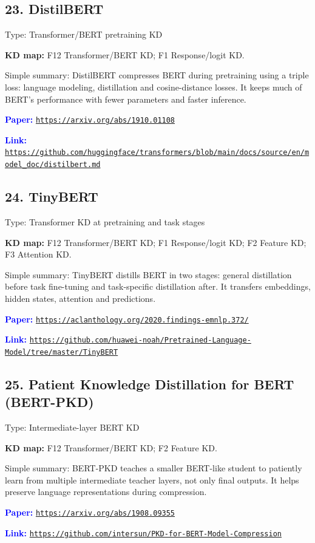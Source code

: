 \documentclass[10pt]{article}
\begin{document}
\subsection*{23. DistilBERT}
Type: Transformer/BERT pretraining KD\par
\textbf{KD map:} F12 Transformer/BERT KD; F1 Response/logit KD.\par
Simple summary: DistilBERT compresses BERT during pretraining using a triple loss: language modeling, distillation and cosine-distance losses. It keeps much of BERT's performance with fewer parameters and faster inference.\par
\textcolor{blue}{\textbf{Paper:}} \href{https://arxiv.org/abs/1910.01108}{\nolinkurl{https://arxiv.org/abs/1910.01108}}\par
\textcolor{blue}{\textbf{Link:}} \href{https://github.com/huggingface/transformers/blob/main/docs/source/en/model_doc/distilbert.md}{\nolinkurl{https://github.com/huggingface/transformers/blob/main/docs/source/en/model_doc/distilbert.md}}\par

\subsection*{24. TinyBERT}
Type: Transformer KD at pretraining and task stages\par
\textbf{KD map:} F12 Transformer/BERT KD; F1 Response/logit KD; F2 Feature KD; F3 Attention KD.\par
Simple summary: TinyBERT distills BERT in two stages: general distillation before task fine-tuning and task-specific distillation after. It transfers embeddings, hidden states, attention and predictions.\par
\textcolor{blue}{\textbf{Paper:}} \href{https://aclanthology.org/2020.findings-emnlp.372/}{\nolinkurl{https://aclanthology.org/2020.findings-emnlp.372/}}\par
\textcolor{blue}{\textbf{Link:}} \href{https://github.com/huawei-noah/Pretrained-Language-Model/tree/master/TinyBERT}{\nolinkurl{https://github.com/huawei-noah/Pretrained-Language-Model/tree/master/TinyBERT}}\par

\subsection*{25. Patient Knowledge Distillation for BERT (BERT-PKD)}
Type: Intermediate-layer BERT KD\par
\textbf{KD map:} F12 Transformer/BERT KD; F2 Feature KD.\par
Simple summary: BERT-PKD teaches a smaller BERT-like student to patiently learn from multiple intermediate teacher layers, not only final outputs. It helps preserve language representations during compression.\par
\textcolor{blue}{\textbf{Paper:}} \href{https://arxiv.org/abs/1908.09355}{\nolinkurl{https://arxiv.org/abs/1908.09355}}\par
\textcolor{blue}{\textbf{Link:}} \href{https://github.com/intersun/PKD-for-BERT-Model-Compression}{\nolinkurl{https://github.com/intersun/PKD-for-BERT-Model-Compression}}\par
\end{document}
